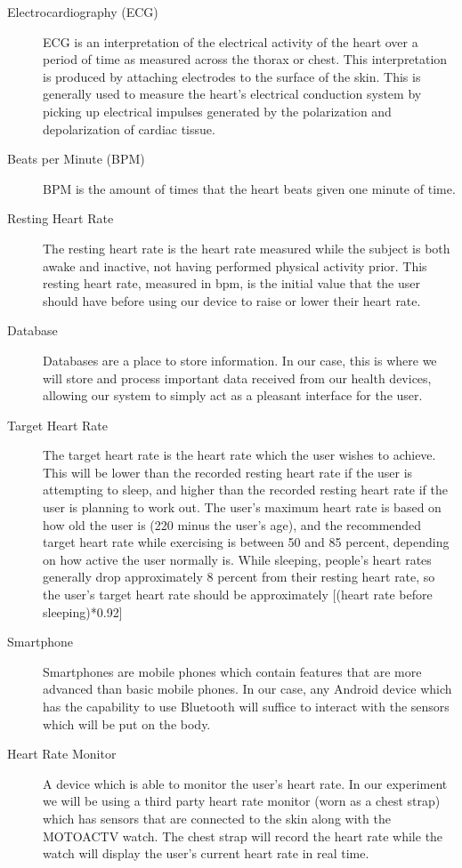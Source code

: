 \documentclass[letterpaper,english, 12pt]{scrreprt}
\begin{document}
\begin{description}
	\item[Electrocardiography (ECG)] ECG is an interpretation of the electrical activity of the heart over a period of time as measured across the thorax or chest. This interpretation is produced by attaching electrodes to the surface of the skin. This is generally used to measure the heart's electrical conduction system by picking up electrical impulses generated by the polarization and depolarization of cardiac tissue.

	\item[Beats per Minute (BPM)] BPM is the amount of times that the heart beats given one minute of time.

	\item[Resting Heart Rate] The resting heart rate is the heart rate measured while the subject is both awake and inactive, not having performed physical activity prior. This resting heart rate, measured in bpm, is the initial value that the user should have before using our device to raise or lower their heart rate.

	\item[Database] Databases are a place to store information. In our case, this is where we will store and process important data received from our health devices, allowing our system to simply act as a pleasant interface for the user.

	\item[Target Heart Rate] The target heart rate is the heart rate which the user wishes to achieve. This will be lower than the recorded resting heart rate if the user is attempting to sleep, and higher than the recorded resting heart rate if the user is planning to work out. The user's maximum heart rate is based on how old the user is (220 minus the user's age), and the recommended target heart rate while exercising is between 50 and 85 percent, depending on how active the user normally is. While sleeping, people's heart rates generally drop approximately 8 percent from their resting heart rate, so the user's target heart rate should be approximately [(heart rate before sleeping)*0.92]

	\item[Smartphone] Smartphones are mobile phones which contain features that are more advanced than basic mobile phones. In our case, any Android device which has the capability to use Bluetooth will suffice to interact with the sensors which will be put on the body.

	\item[Heart Rate Monitor] A device which is able to monitor the user's heart rate. In our experiment we will be using a third party heart rate monitor (worn as a chest strap) which has sensors that are connected to the skin along with the MOTOACTV watch. The chest strap will record the heart rate while the watch will display the user's current heart rate in real time.
\end{description}
\end{document}
